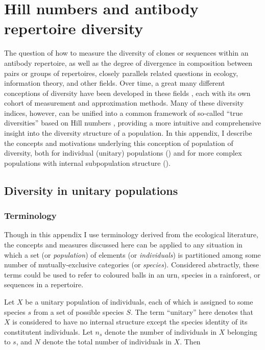 \chapter{Hill numbers and antibody repertoire diversity}
\label{app:diversity}

\normalsize

The question of how to measure the diversity of clones or sequences within an antibody repertoire, as well as the degree of divergence in composition between pairs or groups of repertoires, closely parallels related questions in ecology, information theory, and other fields. Over time, a great many different conceptions of diversity have been developed in these fields \citep{peet1974diversity}, each with its own cohort of measurement and approximation methods. Many of these diversity indices, however, can be unified into a common framework of so-called ``true diversities'' based on Hill numbers \citep{hill1973diversity, jost2006entropy}, providing a more intuitive and comprehensive insight into the diversity structure of a population. In this appendix, I describe the concepts and motivations underlying this conception of population of diversity, both for individual (unitary) populations () and for more complex populations with internal subpopulation structure ().

\section{Diversity in unitary populations}
\label{app:diversity-unitary}

\subsection{Terminology}
\label{app:diversity-unitary-terminology}

Though in this appendix I use terminology derived from the ecological literature, the concepts and measures discussed here can be applied to any situation in which a set (or \textit{population}) of elements (or \textit{individuals}) is partitioned among some number of mutually-exclusive categories (or \textit{species}). Considered abstractly, these terms could be used to refer to coloured balls in an urn, species in a rainforest, or sequences in a repertoire.

Let $X$ be a unitary population of individuals, each of which is assigned to some species $s$ from a set of possible species $S$. The term ``unitary'' here denotes that $X$ is considered to have no internal structure except the species identity of its constitutent individuals. Let $n_s$ denote the number of individuals in $X$ belonging to $s$, and $N$ denote the total number of individuals in $X$. Then 

